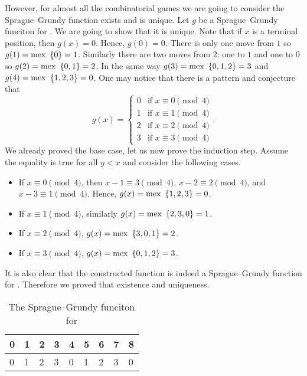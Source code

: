 However, for almost all the combinatorial games we are going to consider
the Sprague--Grundy function exists and is unique.
Let $g$ be a Sprague--Grundy funciton for .
We are going to show that it is unique.
Note that if $x$ is a terminal position, then $g(x) = 0$. Hence, $g(0) = 0$.
There is only one move from $1$ so $g(1) = \mex \set{0} = 1$. Similarly
there are two moves from $2$: one to $1$ and one to $0$ so
$g(2) = \mex \set{0, 1} = 2$. In the same way $g(3) = \mex \set{0, 1, 2} = 3$
and $g(4) = \mex \set{1, 2, 3} = 0$.
One may notice that there is a pattern and conjecture that
\[
  g(x) =
  \begin{cases}
      0 & \text{if } x \equiv 0 \pmod{4} \\
      1 & \text{if } x \equiv 1 \pmod{4} \\
      2 & \text{if } x \equiv 2 \pmod{4} \\
      3 & \text{if } x \equiv 3 \pmod{4}
  \end{cases}.
\]
We already proved the base case, let us now prove the induction step.
Assume the equality is true for all $y < x$ and consider the following cases.
\begin{itemize}
    \item If $x \equiv 0 \pmod{4}$, then $x - 1 \equiv 3 \pmod{4}$,
        $x - 2 \equiv 2 \pmod{4}$, and $x - 3 \equiv 1 \pmod{4}$.
        Hence, $g(x) = \mex \set{1, 2, 3} = 0$.
    \item If $x \equiv 1 \pmod{4}$, similarly $g(x) = \mex \set{2, 3, 0} = 1$.
    \item If $x \equiv 2 \pmod{4}$, $g(x) = \mex \set{3, 0, 1} = 2$.
    \item If $x \equiv 3 \pmod{4}$, $g(x) = \mex \set{0, 1, 2} = 3$.
\end{itemize}
It is also clear that the constructed function is indeed a Sprague--Grundy
function for . Therefore we proved that
existence and uniqueness.
\begin{table}
  \centering
  \begin{tabular}{l l l l l l l l l}
      \toprule
      0 & 1 & 2 & 3 & 4 & 5 & 6 & 7 & 8 \\
      \midrule
      0 & 1 & 2 & 3 & 0 & 1 & 2 & 3 & 0 \\
      \bottomrule
  \end{tabular}
  \caption{The Sprague--Grundy funciton for }
  \label{table:take-away-21-3-2-1-grundy}
\end{table}

